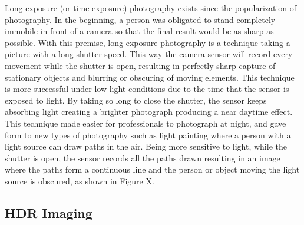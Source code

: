 Long-exposure (or time-exposure) photography exists since the popularization of photography. In the beginning, a person was obligated to stand completely immobile in front of a camera so that the final result would be as sharp as possible.
With this premise, long-exposure photography is a technique taking a picture with a long shutter-speed. This way the camera sensor will record every movement while the shutter is open, resulting in perfectly sharp capture of stationary objects and blurring or obscuring of moving elements.
This technique is more successful under low light conditions due to the time that the sensor is exposed to light. By taking so long to close the shutter, the sensor keeps absorbing light creating a brighter photograph producing a near daytime effect.
This technique made easier for professionals to photograph at night, and gave form to new types of photography such as light painting where a person with a light source can draw paths in the air. Being more sensitive to light, while the shutter is open, the sensor records all the paths drawn resulting in an image where the paths form a continuous line and the person or object moving the light source is obscured, as shown in Figure X.


\subsection{HDR Imaging}

